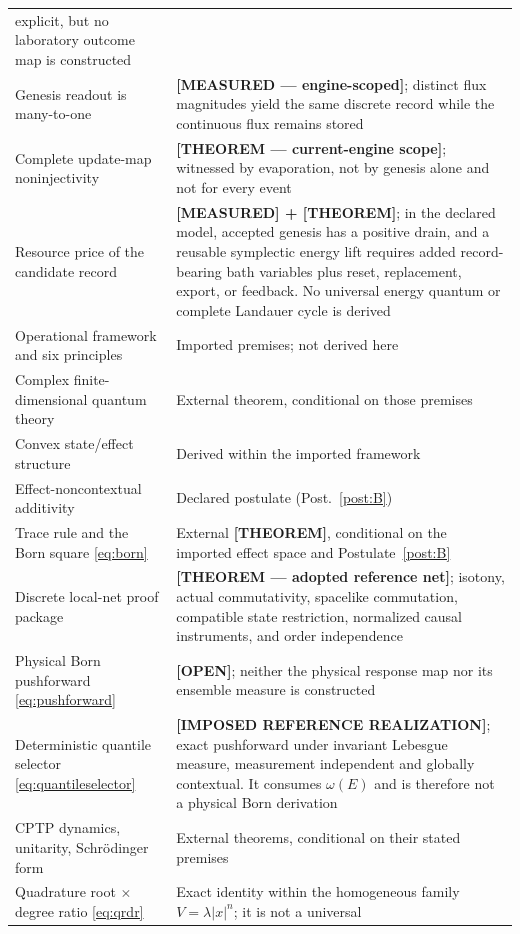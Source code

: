 \documentclass[11pt,a4paper]{article}
\theoremstyle{definition}
\theoremstyle{plain}
\theoremstyle{remark}
\begin{document}
{\begin{longtable}{p{} p{}}
explicit, but no laboratory outcome map is constructed \\
Genesis readout is many-to-one & \textbf{[MEASURED --- engine-scoped]};
distinct flux magnitudes yield the same discrete record while the
continuous flux remains stored \\
Complete update-map noninjectivity & \textbf{[THEOREM --- current-engine
scope]}; witnessed by evaporation, not by genesis alone and not for every
event \\
Resource price of the candidate record & \textbf{[MEASURED] + [THEOREM]};
in the declared model, accepted genesis has a positive drain, and a reusable
symplectic energy lift requires added record-bearing bath variables plus
reset, replacement, export, or feedback. No universal energy quantum or
complete Landauer cycle is derived \\
Operational framework and six principles & Imported premises; not derived
here \\
Complex finite-dimensional quantum theory & External theorem, conditional
on those premises~\cite{cdp} \\
Convex state/effect structure & Derived within the imported framework \\
Effect-noncontextual additivity & Declared postulate
(Post.~\ref{post:B}) \\
Trace rule and the Born square \eqref{eq:born} & External
\textbf{[THEOREM]}, conditional on the imported effect space and
Postulate~\ref{post:B}~\cite{busch} \\
Discrete local-net proof package & \textbf{[THEOREM --- adopted reference
net]}; isotony, actual commutativity, spacelike commutation, compatible state
restriction, normalized causal instruments, and order independence \\
Physical Born pushforward \eqref{eq:pushforward} & \textbf{[OPEN]};
neither the physical response map nor its ensemble measure is constructed
\\
Deterministic quantile selector \eqref{eq:quantileselector} &
\textbf{[IMPOSED REFERENCE REALIZATION]}; exact pushforward under invariant
Lebesgue measure, measurement independent and globally contextual. It consumes
$\omega(E)$ and is therefore not a physical Born derivation \\
CPTP dynamics, unitarity, Schr\"odinger form & External theorems,
conditional on their stated premises \\
Quadrature root $\times$ degree ratio \eqref{eq:qrdr} & Exact identity
within the homogeneous family $V=\lambda|x|^n$; it is not a universal

\end{longtable}}
\end{document}
